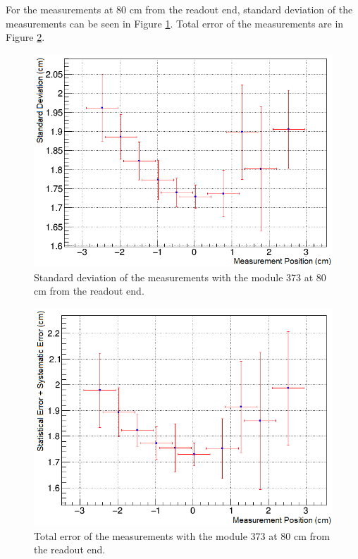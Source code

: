 \documentclass[a4paper]{article}\linespread{1.4}
\begin{document}
For the measurements at 80 cm from the readout end, standard deviation of the measurements can be seen in Figure \ref{fig:73s}. Total error of the measurements are in Figure \ref{fig:73e}. 
\begin{figure}[h!] \hspace*{-0cm} \includegraphics[width=120mm,scale=2.0]{73s.png} \caption{Standard deviation of the measurements with the module 373 at 80 cm from the readout end.}  \label{fig:73s}\end{figure}
\begin{figure}[h!] \hspace*{-0cm} \includegraphics[width=120mm,scale=2.0]{73e.png} \caption{Total error of the measurements with the module 373 at 80 cm from the readout end.}  \label{fig:73e}\end{figure}
\end{document}
